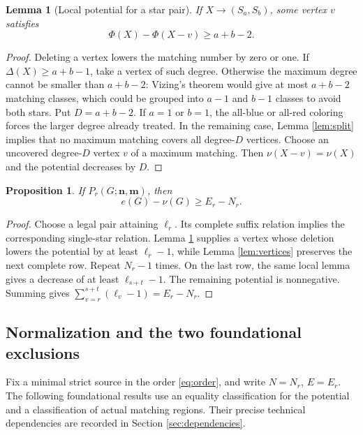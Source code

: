 \documentclass[11pt,a4paper]{article}
\newcommand{\nn}{\mathbf n}\newcommand{\mm}{\mathbf m}
\newtheorem{proposition}[theorem]{Proposition}
\newtheorem{lemma}[theorem]{Lemma}
\theoremstyle{definition}
\begin{document}
\begin{lemma}[Local potential for a star pair]\label{lem:local}
If $X\to(S_a,S_b)$, some vertex $v$ satisfies
\[
\Phi(X)-\Phi(X-v)\ge a+b-2.
\]
\end{lemma}
\begin{proof}
Deleting a vertex lowers the matching number by zero or one. If $\Delta(X)\ge a+b-1$, take a vertex of such degree. Otherwise the maximum degree cannot be smaller than $a+b-2$: Vizing's theorem would give at most $a+b-2$ matching classes, which could be grouped into $a-1$ and $b-1$ classes to avoid both stars.
Put $D=a+b-2$. If $a=1$ or $b=1$, the all-blue or all-red coloring forces the larger degree already treated. In the remaining case, Lemma \ref{lem:split} implies that no maximum matching covers all degree-$D$ vertices. Choose an uncovered degree-$D$ vertex $v$ of a maximum matching. Then $\nu(X-v)=\nu(X)$ and the potential decreases by $D$.
\end{proof}

\begin{proposition}\label{prop:potential}
If $P_r(G;\nn,\mm)$, then
\begin{equation}\label{eq:potential}
e(G)-\nu(G)\ge E_r-N_r.
\end{equation}
\end{proposition}
\begin{proof}
Choose a legal pair attaining $\ell_r$. Its complete suffix relation implies the corresponding single-star relation. Lemma \ref{lem:local} supplies a vertex whose deletion lowers the potential by at least $\ell_r-1$, while Lemma \ref{lem:vertices} preserves the next complete row. Repeat $N_r-1$ times. On the last row, the same local lemma gives a decrease of at least $\ell_{s+t}-1$. The remaining potential is nonnegative. Summing gives
$\sum_{v=r}^{s+t}(\ell_v-1)=E_r-N_r$.
\end{proof}

\subsection{Normalization and the two foundational exclusions}
Fix a minimal strict source in the order \eqref{eq:order}, and write $N=N_r$, $E=E_r$. The following foundational results use an equality classification for the potential and a classification of actual matching regions. Their precise technical dependencies are recorded in Section \ref{sec:dependencies}.
\end{document}

